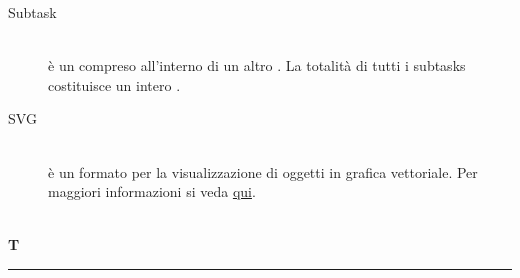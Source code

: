 \documentclass[12pt,a4paper]{article}
\begin{document}
\begin{description}
\item[Subtask] 
\hfill\\è un  compreso all'interno di un altro . La totalità di tutti i subtasks costituisce un intero .

\item[SVG] 
\hfill\\è un formato per la visualizzazione di oggetti in grafica vettoriale. Per maggiori informazioni si veda \href{https://it.wikipedia.org/wiki/Scalable_Vector_Graphics}{qui}.


\end{description}

\newpage

\begin{center}
\hfill\\
	\LARGE \textbf{T}
\hfill\\
\rule[15pt]{30pt}{0.5pt}
\end{center}
\end{document}
